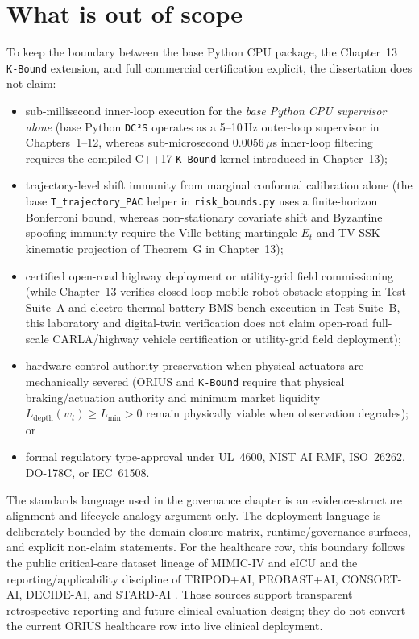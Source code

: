 \section{What is out of scope}
To keep the boundary between the base Python CPU package, the Chapter~13 \texttt{K-Bound}
extension, and full commercial certification explicit, the dissertation does not claim:
\begin{itemize}
  \item sub-millisecond inner-loop execution for the \emph{base Python CPU supervisor alone} (base Python \texttt{DC³S} operates as a 5--10\,Hz outer-loop supervisor in Chapters~1--12, whereas sub-microsecond 0.0056\,$\mu$s inner-loop filtering requires the compiled C++17 \texttt{K-Bound} kernel introduced in Chapter~13);
  \item trajectory-level shift immunity from marginal conformal calibration alone (the base \texttt{T\_trajectory\_PAC} helper in \texttt{risk\_bounds.py} uses a finite-horizon Bonferroni bound, whereas non-stationary covariate shift and Byzantine spoofing immunity require the Ville betting martingale $E_t$ and TV-SSK kinematic projection of Theorem~G in Chapter~13);
  \item certified open-road highway deployment or utility-grid field commissioning (while Chapter~13 verifies closed-loop mobile robot obstacle stopping in Test Suite~A and electro-thermal battery BMS bench execution in Test Suite~B, this laboratory and digital-twin verification does not claim open-road full-scale CARLA/highway vehicle certification or utility-grid field deployment);
  \item hardware control-authority preservation when physical actuators are mechanically severed (ORIUS and \texttt{K-Bound} require that physical braking/actuation authority and minimum market liquidity $L_{\text{depth}}(w_t)\ge L_{\min}>0$ remain physically viable when observation degrades); or
  \item formal regulatory type-approval under UL~4600, NIST AI RMF, ISO~26262, DO-178C, or IEC~61508.
\end{itemize}
The standards language used in the governance chapter is an evidence-structure alignment and
lifecycle-analogy argument only. The deployment language is deliberately bounded by the
domain-closure matrix, runtime/governance surfaces, and explicit non-claim statements.
For the healthcare row, this boundary follows the public critical-care dataset lineage
of MIMIC-IV and eICU \cite{johnson2023mimiciv,physionet2024mimiciv31,pollard2018eicu}
and the reporting/applicability discipline of TRIPOD+AI, PROBAST+AI, CONSORT-AI,
DECIDE-AI, and STARD-AI
\cite{collins2024tripodai,moons2025probastai,liu2020consortai,vasey2022decideai,stardai2025}.
Those sources support transparent retrospective reporting and future clinical-evaluation
design; they do not convert the current ORIUS healthcare row into live clinical deployment.

